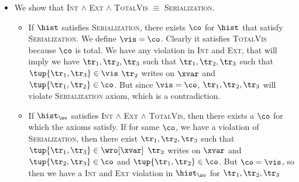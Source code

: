 \begin{itemize}
 \item We show that \textsc{Int} $\land$ \textsc{Ext} $\land$ \textsc{TotalVis} $\equiv$ \textsc{Serialization}.
       
       \begin{itemize}
        \item If $\hist$ satisfies \textsc{Serialization}, there exists $\co$ for $\hist$ that satisfy \textsc{Serialization}. We define $\vis = \co$. Clearly it satisfies \textsc{TotalVis} because $\co$ is total. We have any violation in \textsc{Int} and \textsc{Ext}, that will imply we have $\tr_1, \tr_2,\tr_3$ such that  $\tr_1, \tr_2, \tr_3$ such that $\tup{\tr_1, \tr_3} \in \vis$ $\tr_2$ writes on $\xvar$ and $\tup{\tr_1, \tr_2} \in \co$. But since $\vis = \co$, $\tr_1, \tr_2, \tr_3$ will violate \textsc{Serialization} axiom, which is a contradiction.
              
        \item If $\hist_{\so}$ satisfies \textsc{Int} $\land$ \textsc{Ext} $\land$ \textsc{TotalVis}, then there exists a $\co$ for which the axioms satisfy. If for same $\co$, we have a violation of \textsc{Serialization}, then there exist $\tr_1, \tr_2, \tr_3$ such that $\tup{\tr_1, \tr_3} \in \wro[\xvar]$ $\tr_2$ writes on $\xvar$ and $\tup{\tr_2, \tr_3} \in \co$ and $\tup{\tr_1, \tr_2} \in \co$. But $\co = \vis$, so then we have a \textsc{Int} and \textsc{Ext} violation in $\hist_{\so}$ for $\tr_1, \tr_2, \tr_3$
       \end{itemize}
       
\end{itemize}

